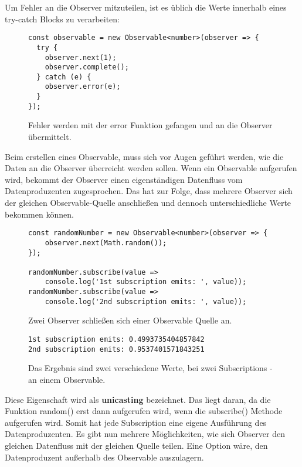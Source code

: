 \noindent
Um Fehler an die Observer mitzuteilen, ist es üblich die Werte innerhalb eines try-catch Blocks zu verarbeiten:

\begin{figure}[H]
\begin{lstlisting}[basicstyle=\small]
const observable = new Observable<number>(observer => {
  try {
    observer.next(1);
    observer.complete();
  } catch (e) {
    observer.error(e);
  }
});
\end{lstlisting}
\caption{Fehler werden mit der error Funktion gefangen und an die Observer übermittelt.}
\label{catch-error-obs}
\end{figure}

\noindent
Beim erstellen eines Observable, muss sich vor Augen geführt werden, wie die Daten an die Observer überreicht werden sollen. Wenn ein Observable aufgerufen wird, bekommt der Observer einen eigenständigen Datenfluss vom Datenproduzenten zugesprochen. Das hat zur Folge, dass mehrere Observer sich der gleichen Observable-Quelle anschließen und dennoch unterschiedliche Werte bekommen können.

\begin{figure}[H]
\begin{lstlisting}[basicstyle=\small]
const randomNumber = new Observable<number>(observer => {
    observer.next(Math.random());
});

randomNumber.subscribe(value =>
    console.log('1st subscription emits: ', value));
randomNumber.subscribe(value =>
    console.log('2nd subscription emits: ', value));
\end{lstlisting}
\caption{Zwei Observer schließen sich einer Observable Quelle an.}
\end{figure}

\begin{figure}[H]
\begin{lstlisting}
1st subscription emits: 0.4993735404857842
2nd subscription emits: 0.9537401571843251
\end{lstlisting}
\caption{Das Ergebnis sind zwei verschiedene Werte, bei zwei Subscriptions - an einem Observable.}
\end{figure}

\noindent
Diese Eigenschaft wird als \textbf{unicasting} bezeichnet. Das liegt daran, da die Funktion random() erst dann aufgerufen wird, wenn die subscribe() Methode aufgerufen wird. Somit hat jede Subscription eine eigene Ausführung des Datenproduzenten. Es gibt nun mehrere Möglichkeiten, wie sich Observer den gleichen Datenfluss mit der gleichen Quelle teilen. Eine Option wäre, den Datenproduzent außerhalb des Observable auszulagern. 

